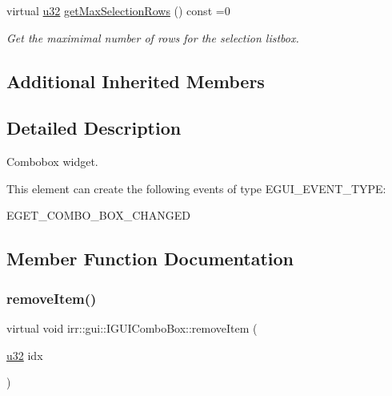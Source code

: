 \begin{DoxyCompactItemize}
\mbox{\label{classirr_1_1gui_1_1IGUIComboBox_afc75706835598a9016ce8a8f020c690c}} 
virtual \hyperlink{namespaceirr_a0416a53257075833e7002efd0a18e804}{u32} \hyperlink{classirr_1_1gui_1_1IGUIComboBox_afc75706835598a9016ce8a8f020c690c}{get\+Max\+Selection\+Rows} () const =0
\begin{DoxyCompactList}\small\item\em Get the maximimal number of rows for the selection listbox. \end{DoxyCompactList}\end{DoxyCompactItemize}
\subsection*{Additional Inherited Members}


\subsection{Detailed Description}
Combobox widget. 

\begin{DoxyParagraph}{This element can create the following events of type E\+G\+U\+I\+\_\+\+E\+V\+E\+N\+T\+\_\+\+T\+Y\+PE\+:}
\begin{DoxyItemize}
\item E\+G\+E\+T\+\_\+\+C\+O\+M\+B\+O\+\_\+\+B\+O\+X\+\_\+\+C\+H\+A\+N\+G\+ED \end{DoxyItemize}

\end{DoxyParagraph}


\subsection{Member Function Documentation}
\mbox{\label{classirr_1_1gui_1_1IGUIComboBox_aa6a351f80aa57374459a9d66f416ce3c}} 
\subsubsection{\texorpdfstring{remove\+Item()}{removeItem()}}
{\footnotesize\ttfamily virtual void irr\+::gui\+::\+I\+G\+U\+I\+Combo\+Box\+::remove\+Item (\begin{DoxyParamCaption}\item[{\hyperlink{namespaceirr_a0416a53257075833e7002efd0a18e804}{u32}}]{idx }\end{DoxyParamCaption})\hspace{0.3cm}{\ttfamily [pure virtual]}}



